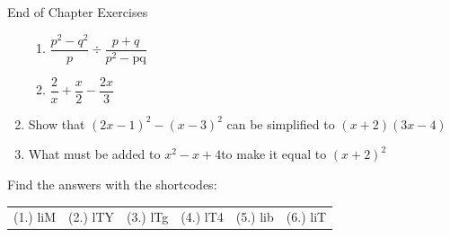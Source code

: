 \begin{eocexercises}{End of Chapter Exercises}
\begin{enumerate}[itemsep=5pt, label=\textbf{\arabic*}. ]
\begin{enumerate}[itemsep=5pt, label=\textbf{\alph*}. ]
            \item $\dfrac{{p}^{2}-{q}^{2}}{p}÷\dfrac{p+q}{{p}^{2}-\mathrm{pq}}$\item $\dfrac{2}{x}+\dfrac{x}{2}-\dfrac{2x}{3}$\end{enumerate}
\label{m39392*uid56}\item Show that ${\left(2x-1\right)}^{2}-{\left(x-3\right)}^{2}$ can be simplified to $\left(x+2\right)\left(3x-4\right)$
\newline
\newline
\label{m39392*uid57}\item What must be added to ${x}^{2}-x+4$\hspace{1ex}to make it equal to ${\left(x+2\right)}^{2}$
\newline
\newline
\end{enumerate}
  \label{m39392**end}
  \label{d4e6ddcad4e2d9e383c4732da6858c66**end}
\par {} Find the answers with the shortcodes:
 \par \begin{tabular}[h]{cccccc}
 (1.) liM  &  (2.) lTY  &  (3.) lTg  &  (4.) lT4  &  (5.) lib  &  (6.) liT  & \end{tabular}
\end{eocexercises}
